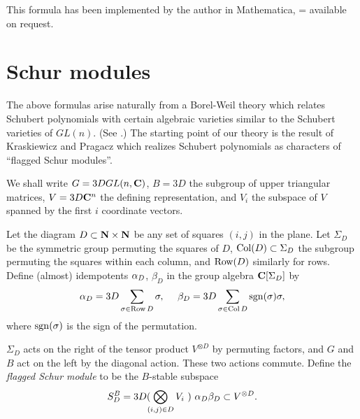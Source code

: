 This formula has been implemented by the author in Mathematica, =
available
on request.

\section{Schur modules}

The above formulas arise naturally from a Borel-Weil
theory which relates Schubert polynomials with certain
algebraic varieties similar to the Schubert varieties
of $GL(n)$.  (See \cite{Mag2}.)
The starting point of our theory
is the result of Kraskiewicz and Pragacz
which realizes Schubert polynomials as characters
of ``flagged Schur modules''.

We shall write $G =3D GL(n,{\bf C})$,
$B =3D $ the subgroup
of upper triangular matrices,
$V =3D {\bf C}^n$ the
defining representation,
and $V_i$ the subspace of $V$
spanned by the first $i$ coordinate vectors.

Let the diagram $D \subset {\bf N} \times {\bf N}$ be
any set of squares $(i,j)$ in the plane.
Let $\Sigma_D$ be the
symmetric group permuting the squares of $D$,
 $\mathop{\rm Col}(D) \subset \Sigma_D$ the subgroup permuting
the squares within each column, and $\mathop{\rm Row}(D)$
similarly for rows.
Define (almost) idempotents
${\alpha}_D$, $\beta_D$ in the group algebra
${\bf C}[\Sigma_D]$ by
$$
{\alpha_D} =3D  \sum_{\sigma \in \mathop{\rm Row} D} \sigma, \ \ \ \
{\beta_D} =3D  \sum_{\sigma \in \mathop{\rm Col} D} \mathop{\rm sgn}(\sigma) \sigma ,
$$
where $\mathop{\rm sgn}(\sigma)$ is the sign of the permutation.

$\Sigma_D$ acts on the right of the tensor product
$V^{\otimes D}$ by permuting factors,
and $G$ and  $B$ act on the left
by the diagonal action.
These two actions commute.
Define the {\em flagged Schur module}
to be the $B$-stable subspace
$$
S_D^B =3D (\! \! \bigotimes_{(i,j) \in D} V_i \ )
\ {\alpha_D} {\beta_D}
\subset V^{\otimes D} .
$$

